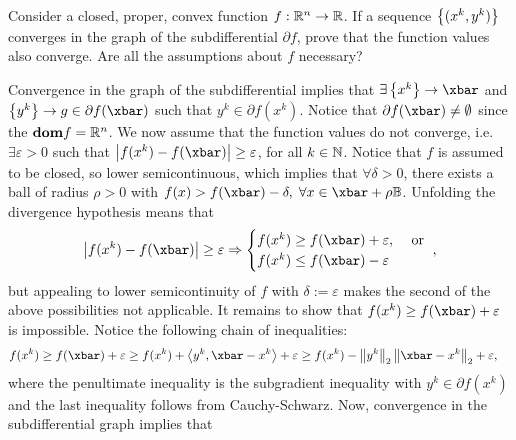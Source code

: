 \documentclass[10pt]{article}
\newcommand{\eps}{\varepsilon}
\begin{document}
\allowdisplaybreaks
\newenvironment{longlisting}{\captionsetup{type=listing}}{}


\begin{Exercise}
	Consider a closed, proper, convex function $f: \mathbb{R}^n \to \mathbb{R}$. If a
	sequence $\left\{ (x^k, y^k) \right\}$ converges in the graph of the subdifferential
	$\partial f$, prove that the function values also converge. Are all the
	assumptions about $f$ necessary?
\end{Exercise}
\begin{Answer}
	Convergence in the graph of the subdifferential implies that $\exists
	\set{x^k} \to \xbar$ and $\set{y^k} \to g \in \partial f(\xbar)$ such that
	$y^k \in \partial f(x^k)$. Notice that $\partial f(\xbar) \neq \emptyset$
	since the $\textbf{dom} f = \mathbb{R}^n$. We now assume that the function values do not
	converge, i.e. $\exists \eps > 0$ such that $\abs{f(x^k) - f(\xbar)} \geq
	\eps$, for all $k \in \mathbb{N}$. Notice that $f$ is assumed to be closed, so
	lower semicontinuous, which implies that $\forall \delta > 0$, there exists
	a ball of radius $\rho > 0$ with $f(x) > f(\xbar) - \delta, \; \forall x \in
	\xbar + \rho \mathbb{B}$. Unfolding the divergence hypothesis means that
	\[
		\abs{f(x^k) - f(\xbar)} \geq \eps \Rightarrow
		\begin{cases}
			f(x^k) \geq f(\xbar) + \eps, & \text{ or } \\
			f(x^k) \leq f(\xbar) - \eps
		\end{cases},
	\]
	but appealing to lower semicontinuity of $f$ with $\delta := \eps$ makes
	the second of the above possibilities not applicable. It remains to show
	that $f(x^k) \geq f(\xbar) + \eps$ is impossible. Notice the following
	chain of inequalities:
	\begin{align*}
		f(x^k) &\geq f(\xbar) + \eps \geq f(x^k) + \ip{y^k, \xbar - x^k} + \eps
			    \geq f(x^k) - \norm{y^k}_2 \norm{\xbar - x^k}_2 + \eps,
	\end{align*}
	where the penultimate inequality is the subgradient inequality with $y^k \in
	\partial f(x^k)$ and the last inequality follows from Cauchy-Schwarz. Now,
	convergence in the subdifferential graph implies that
\end{Answer}
\end{document}
